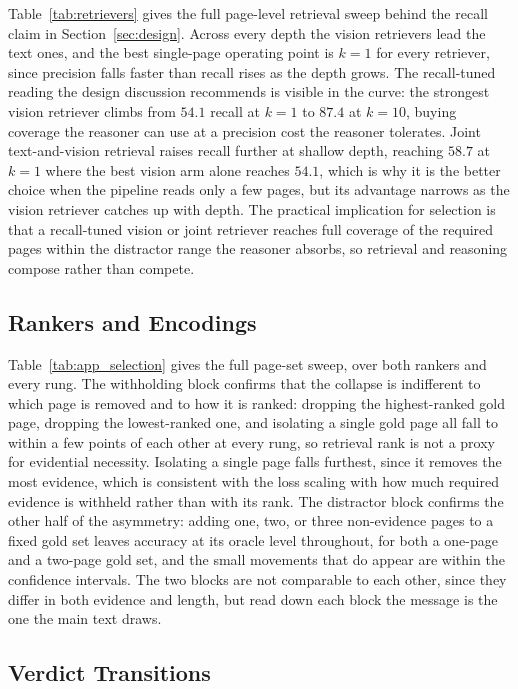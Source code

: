 Table~\ref{tab:retrievers} gives the full page-level retrieval sweep behind the recall claim in Section~\ref{sec:design}. Across every depth the vision retrievers lead the text ones, and the best single-page operating point is $k{=}1$ for every retriever, since precision falls faster than recall rises as the depth grows. The recall-tuned reading the design discussion recommends is visible in the curve: the strongest vision retriever climbs from $54.1$ recall at $k{=}1$ to $87.4$ at $k{=}10$, buying coverage the reasoner can use at a precision cost the reasoner tolerates. Joint text-and-vision retrieval raises recall further at shallow depth, reaching $58.7$ at $k{=}1$ where the best vision arm alone reaches $54.1$, which is why it is the better choice when the pipeline reads only a few pages, but its advantage narrows as the vision retriever catches up with depth. The practical implication for selection is that a recall-tuned vision or joint retriever reaches full coverage of the required pages within the distractor range the reasoner absorbs, so retrieval and reasoning compose rather than compete.

\subsection{Rankers and Encodings}
\label{app:selection_sweep}

Table~\ref{tab:app_selection} gives the full page-set sweep, over both rankers and every rung. The withholding block confirms that the collapse is indifferent to which page is removed and to how it is ranked: dropping the highest-ranked gold page, dropping the lowest-ranked one, and isolating a single gold page all fall to within a few points of each other at every rung, so retrieval rank is not a proxy for evidential necessity. Isolating a single page falls furthest, since it removes the most evidence, which is consistent with the loss scaling with how much required evidence is withheld rather than with its rank. The distractor block confirms the other half of the asymmetry: adding one, two, or three non-evidence pages to a fixed gold set leaves accuracy at its oracle level throughout, for both a one-page and a two-page gold set, and the small movements that do appear are within the confidence intervals. The two blocks are not comparable to each other, since they differ in both evidence and length, but read down each block the message is the one the main text draws.

\subsection{Verdict Transitions}
\label{app:selection_transitions}

